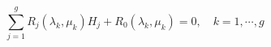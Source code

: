 \begin{equation}
 \sum_{j=1}^g R_j(\lambda_k,\mu_k) H_j + R_0(\lambda_k,\mu_k) = 0,\quad k=1,\cdots ,g
\label{baxterclassique}
\end{equation}

